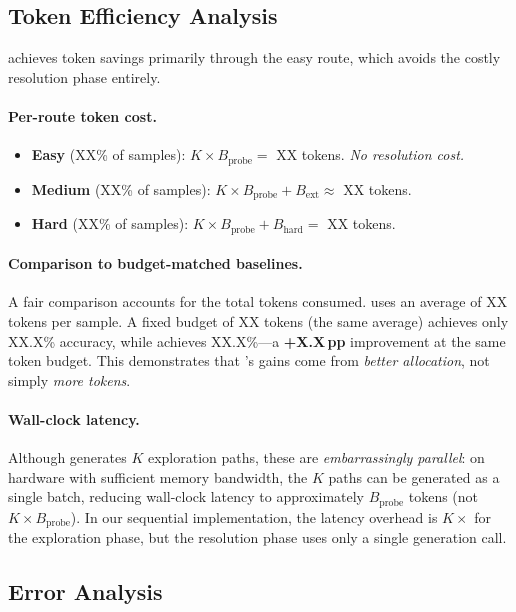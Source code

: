 \subsection{Token Efficiency Analysis}
\label{sec:analysis:efficiency}

\method{} achieves token savings primarily through the easy route, which avoids the costly resolution phase entirely.

\paragraph{Per-route token cost.}
\begin{itemize}[nosep]
\item \textbf{Easy} (XX\% of samples): $K \times B_\text{probe} = $ XX tokens. \textit{No resolution cost.}
\item \textbf{Medium} (XX\% of samples): $K \times B_\text{probe} + B_\text{ext} \approx $ XX tokens.
\item \textbf{Hard} (XX\% of samples): $K \times B_\text{probe} + B_\text{hard} = $ XX tokens.
\end{itemize}

\paragraph{Comparison to budget-matched baselines.}
A fair comparison accounts for the total tokens consumed.
\method{} uses an average of XX tokens per sample.
A fixed budget of XX tokens (the same average) achieves only XX.X\% accuracy, while \method{} achieves XX.X\%---a \textbf{+X.X\,pp} improvement at the same token budget.
This demonstrates that \method{}'s gains come from \emph{better allocation}, not simply \emph{more tokens}.

\paragraph{Wall-clock latency.}
Although \method{} generates $K$ exploration paths, these are \emph{embarrassingly parallel}: on hardware with sufficient memory bandwidth, the $K$ paths can be generated as a single batch, reducing wall-clock latency to approximately $B_\text{probe}$ tokens (not $K \times B_\text{probe}$).
In our sequential implementation, the latency overhead is $K\times$ for the exploration phase, but the resolution phase uses only a single generation call.

\subsection{Error Analysis}
\label{sec:analysis:errors}


